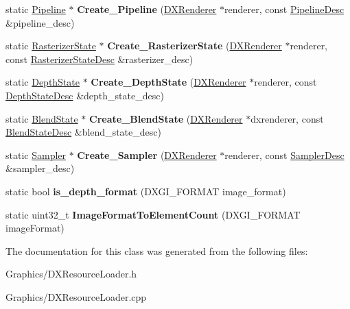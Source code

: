 \begin{DoxyCompactItemize}
\item 
\mbox{\label{classDXResourceLoader_a72a314827079951bfe5dd41fbab56229}} 
static \hyperlink{classPipeline}{Pipeline} $\ast$ {\bfseries Create\+\_\+\+Pipeline} (\hyperlink{classDXRenderer}{D\+X\+Renderer} $\ast$renderer, const \hyperlink{structPipelineDesc}{Pipeline\+Desc} \&pipeline\+\_\+desc)
\item 
\mbox{\label{classDXResourceLoader_a3c7d160030a87f4973a9c2ec1893188f}} 
static \hyperlink{classRasterizerState}{Rasterizer\+State} $\ast$ {\bfseries Create\+\_\+\+Rasterizer\+State} (\hyperlink{classDXRenderer}{D\+X\+Renderer} $\ast$renderer, const \hyperlink{structRasterizerStateDesc}{Rasterizer\+State\+Desc} \&rasterizer\+\_\+desc)
\item 
\mbox{\label{classDXResourceLoader_a470927b59b264d5ca7fc22b63d20801e}} 
static \hyperlink{classDepthState}{Depth\+State} $\ast$ {\bfseries Create\+\_\+\+Depth\+State} (\hyperlink{classDXRenderer}{D\+X\+Renderer} $\ast$renderer, const \hyperlink{structDepthStateDesc}{Depth\+State\+Desc} \&depth\+\_\+state\+\_\+desc)
\item 
\mbox{\label{classDXResourceLoader_a9dffe29c8089cefc88b40f4972d13869}} 
static \hyperlink{classBlendState}{Blend\+State} $\ast$ {\bfseries Create\+\_\+\+Blend\+State} (\hyperlink{classDXRenderer}{D\+X\+Renderer} $\ast$dxrenderer, const \hyperlink{structBlendStateDesc}{Blend\+State\+Desc} \&blend\+\_\+state\+\_\+desc)
\item 
\mbox{\label{classDXResourceLoader_aa1dac912b27e610a2c6a453c541bac02}} 
static \hyperlink{classSampler}{Sampler} $\ast$ {\bfseries Create\+\_\+\+Sampler} (\hyperlink{classDXRenderer}{D\+X\+Renderer} $\ast$renderer, const \hyperlink{structSamplerDesc}{Sampler\+Desc} \&sampler\+\_\+desc)
\item 
\mbox{\label{classDXResourceLoader_ae28fea88e1f6f96d526b58219d5de6ac}} 
static bool {\bfseries is\+\_\+depth\+\_\+format} (D\+X\+G\+I\+\_\+\+F\+O\+R\+M\+AT image\+\_\+format)
\item 
\mbox{\label{classDXResourceLoader_aba7dbf81d5e8a3bf81406465c10f8bd6}} 
static uint32\+\_\+t {\bfseries Image\+Format\+To\+Element\+Count} (D\+X\+G\+I\+\_\+\+F\+O\+R\+M\+AT image\+Format)
\end{DoxyCompactItemize}


The documentation for this class was generated from the following files\+:\begin{DoxyCompactItemize}
\item 
Graphics/D\+X\+Resource\+Loader.\+h\item 
Graphics/D\+X\+Resource\+Loader.\+cpp\end{DoxyCompactItemize}

